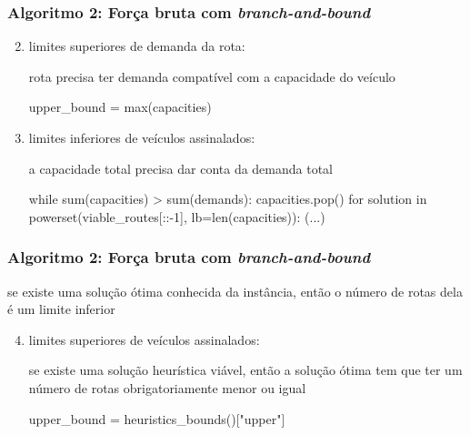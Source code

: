 \documentclass{beamer}
\begin{document}




\begin{frame}[fragile] %
    \frametitle{Algoritmo 2: Força bruta com \emph{branch-and-bound}}

    \begin{enumerate}
        \setcounter{enumi}{1}
        \item limites superiores de demanda da rota:
    \begin{block}{rota precisa ter demanda compatível com a capacidade do veículo}
    \begin{python}
    upper_bound = max(capacities)
    \end{python}
    \end{block}

        \item limites inferiores de veículos assinalados:
    \begin{block}{a capacidade total precisa dar conta da demanda total}
    \begin{python}
    while sum(capacities) > sum(demands):
        capacities.pop()
    for solution in powerset(viable_routes[::-1],
                             lb=len(capacities)):
        (...)
    \end{python}
    \end{block}
        
    \end{enumerate}


\end{frame}


\begin{frame}[fragile] %
    \frametitle{Algoritmo 2: Força bruta com \emph{branch-and-bound}}

    \begin{block}{se existe uma solução ótima conhecida da instância, então o número de rotas dela é um limite inferior}
    
    \end{block}

    \begin{enumerate}
        \setcounter{enumi}{3}
        \item limites superiores de veículos assinalados:

    \begin{block}{se existe uma solução heurística viável, então a solução ótima tem que ter um número de rotas obrigatoriamente menor ou igual}
    \begin{python}
    upper_bound = heuristics_bounds()["upper"]
    \end{python}
    \end{block}
        
    \end{enumerate}

\end{frame}
\end{document}
